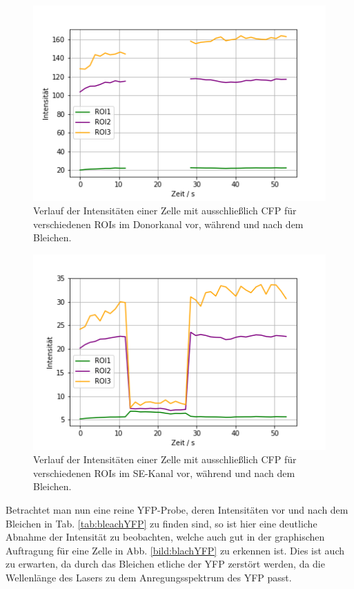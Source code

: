 \begin{figure}[h]
    \centering
    \includegraphics[scale = 0.65]{Bilder/bleachPlotCFPd.png}
    \caption{Verlauf der Intensitäten einer Zelle mit ausschließlich CFP für verschiedenen ROIs im Donorkanal vor, während und nach dem Bleichen.}
    \label{bild:bleachCFPd}
\end{figure}

\begin{figure}[h]
    \centering
    \includegraphics[scale = 0.65]{Bilder/bleachPlotCFPs.png}
    \caption{Verlauf der Intensitäten einer Zelle mit ausschließlich CFP für verschiedenen ROIs im SE-Kanal vor, während und nach dem Bleichen.}
    \label{bild:bleachCFPs}
\end{figure}

Betrachtet man nun eine reine YFP-Probe, deren Intensitäten vor und nach dem Bleichen in Tab. \ref{tab:bleachYFP} zu finden sind, so 
ist hier eine deutliche Abnahme der Intensität zu beobachten, welche auch gut in der graphischen Auftragung für eine Zelle in Abb. 
\ref{bild:blachYFP} zu erkennen ist. Dies ist auch zu erwarten, da durch das Bleichen etliche der YFP zerstört werden, da die Wellenlänge 
des Lasers zu dem Anregungsspektrum des YFP passt.

